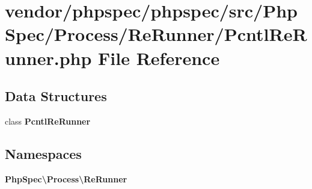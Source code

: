 \section{vendor/phpspec/phpspec/src/\+Php\+Spec/\+Process/\+Re\+Runner/\+Pcntl\+Re\+Runner.php File Reference}
\label{_pcntl_re_runner_8php}
\subsection*{Data Structures}
\begin{DoxyCompactItemize}
\item 
class {\bf Pcntl\+Re\+Runner}
\end{DoxyCompactItemize}
\subsection*{Namespaces}
\begin{DoxyCompactItemize}
\item 
 {\bf Php\+Spec\textbackslash{}\+Process\textbackslash{}\+Re\+Runner}
\end{DoxyCompactItemize}
